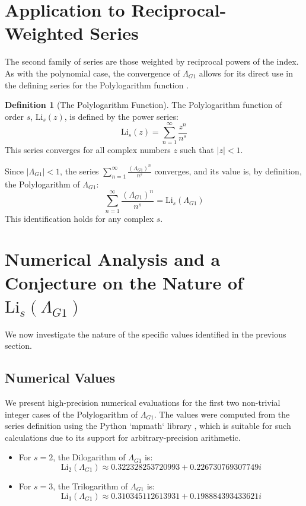 \documentclass{amsart}
\theoremstyle{plain}
\theoremstyle{definition}
\newtheorem{definition}[theorem]{Definition}
\theoremstyle{remark}
\newcommand{\LambdaG}{\Lambda_{G1}}
\begin{document}
\section{Application to Reciprocal-Weighted Series}
The second family of series are those weighted by reciprocal powers of the index. As with the polynomial case, the convergence of $\LambdaG$ allows for its direct use in the defining series for the Polylogarithm function \cite{Lewin}.

\begin{definition}[The Polylogarithm Function]
The Polylogarithm function of order $s$, $\mathrm{Li}_s(z)$, is defined by the power series:
$$ \mathrm{Li}_s(z) = \sum_{n=1}^{\infty} \frac{z^n}{n^s} $$
This series converges for all complex numbers $z$ such that $|z|<1$.
\end{definition}

Since $|\LambdaG| < 1$, the series $\sum_{n=1}^{\infty} \frac{(\LambdaG)^{n}}{n^s}$ converges, and its value is, by definition, the Polylogarithm of $\LambdaG$:
$$ \sum_{n=1}^{\infty} \frac{(\LambdaG)^{n}}{n^s} = \mathrm{Li}_s(\LambdaG) $$
This identification holds for any complex $s$.

\section{Numerical Analysis and a Conjecture on the Nature of \texorpdfstring{$\mathrm{Li}_s(\Lambda_{G1})$}{Li\_s(Lambda\_G1)}}
We now investigate the nature of the specific values identified in the previous section.

\subsection{Numerical Values}
We present high-precision numerical evaluations for the first two non-trivial integer cases of the Polylogarithm of $\LambdaG$. The values were computed from the series definition using the Python `mpmath` library \cite{mpmath}, which is suitable for such calculations due to its support for arbitrary-precision arithmetic.
\begin{itemize}
    \item For $s=2$, the Dilogarithm of $\LambdaG$ is:
    $$ \mathrm{Li}_2(\LambdaG) \approx 0.322328253720993 + 0.226730769307749i $$
    \item For $s=3$, the Trilogarithm of $\LambdaG$ is:
    $$ \mathrm{Li}_3(\LambdaG) \approx 0.310345112613931 + 0.198884393433621i $$
\end{itemize}
\end{document}
